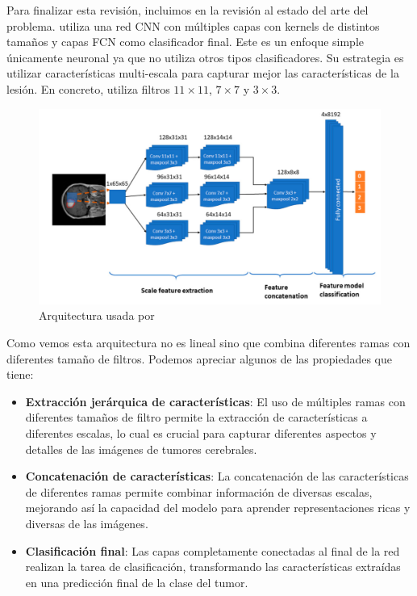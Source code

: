 Para finalizar esta revisión, incluimos en la revisión al estado del arte del problema. \cite{diaz2021deep} utiliza una red CNN con múltiples capas con kernels de distintos tamaños y capas FCN como clasificador final. Este es un enfoque simple únicamente neuronal ya que no utiliza otros tipos clasificadores. Su estrategia es utilizar características multi-escala para capturar mejor las características de la lesión. En concreto, utiliza filtros $11 \times 11$, $7 \times 7$ y $3 \times 3$.

\begin{figure}[H]
	\centering
	\includegraphics[width=1.0\linewidth]{imagenes/diaz2021deep.png}
	\caption{Arquitectura usada por \cite{diaz2021deep}}
\end{figure}

Como vemos esta arquitectura no es lineal sino que combina diferentes ramas con diferentes tamaño de filtros. Podemos apreciar algunos de las propiedades que tiene:

\begin{itemize}
	\item \textbf{Extracción jerárquica de características}: El uso de múltiples ramas con diferentes tamaños de filtro permite la extracción de características a diferentes escalas, lo cual es crucial para capturar diferentes aspectos y detalles de las imágenes de tumores cerebrales.
	\item \textbf{Concatenación de características}: La concatenación de las características de diferentes ramas permite combinar información de diversas escalas, mejorando así la capacidad del modelo para aprender representaciones ricas y diversas de las imágenes.
	\item \textbf{Clasificación final}: Las capas completamente conectadas al final de la red realizan la tarea de clasificación, transformando las características extraídas en una predicción final de la clase del tumor.
\end{itemize}


